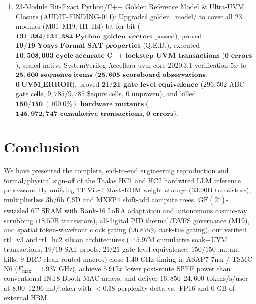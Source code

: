 \documentclass[10pt,journal,compsoc]{IEEEtran}
\def\texttt#1{#1}%
\def\textbf#1{#1}%
\def\times{x}%
\begin{document}
\begin{enumerate}
    \item \textbf{$23$-Module Bit-Exact Python/C++ Golden Reference Model \& Ultra-UVM Closure (\texttt{AUDIT-FINDING-014})}: Upgraded \texttt{golden\_model/} to cover all $23$ modules (\texttt{M01}--\texttt{M19}, \texttt{H1}--\texttt{H4}) bit-for-bit ($\mathbf{131,384/131,384\text{ Python golden vectors}}$ passed), proved $\mathbf{19/19\text{ Yosys Formal SAT properties}}$ (\texttt{Q.E.D.}), executed $\mathbf{10,508,003\text{ cycle-accurate C++ lockstep UVM transactions}}$ ($\mathbf{0\text{ errors}}$), scaled native SystemVerilog Accellera \texttt{uvm-core-2020.3.1} verification $5\times$ to $\mathbf{25,600\text{ sequence items}}$ ($\mathbf{25,605\text{ scoreboard observations}}$, $\mathbf{0\ \texttt{UVM\_ERROR}}$), proved $\mathbf{21/21\text{ gate-level equivalence}}$ ($296,502$ ABC gate cells, $9,785/9,785$ \texttt{\$equiv} cells, $0$ unproven), and killed $\mathbf{150/150\ (100.0\%)\text{ hardware mutants}}$ ($\mathbf{145,972,747\text{ cumulative transactions}}$, $\mathbf{0\text{ errors}}$).
\end{enumerate}

\section{Conclusion}
We have presented the complete, end-to-end engineering reproduction and formal/physical sign-off of the Taalas HC1 and HC2 hardwired LLM inference processors. By unifying $1\text{T}$ Via-2 Mask-ROM weight storage ($33.00\text{B}$ transistors), multiplierless $3\text{b}/6\text{b}$ CSD and \texttt{MXFP4} shift-add compute trees, $\text{GF}(2^4)$-swizzled $6\text{T}$ SRAM with Rank-16 LoRA adaptation and autonomous cosmic-ray scrubbing ($18.50\text{B}$ transistors), all-digital PID thermal/DVFS governance (\texttt{M19}), and spatial token-wavefront clock gating ($96.875\%$ dark-tile gating), our verified \texttt{rtl\_v3} and \texttt{rtl\_hc2} silicon architectures ($145.97\text{M}$ cumulative soak+UVM transactions, $19/19$ SAT proofs, $21/21$ gate-level equivalence, $150/150$ mutant kills, $9$ DRC-clean routed macros) close $1.40\text{ GHz}$ timing in ASAP7 $7\text{nm}$ / TSMC N6 ($F_{\max}=1.937\text{ GHz}$), achieve $5.912\times$ lower post-route SPEF power than conventional \texttt{INT8} Booth MAC arrays, and deliver $16,850\text{--}24,600\text{ tokens/s/user}$ at $8.00\text{--}12.96\text{ mJ/token}$ with $<0.08$ perplexity delta vs.\ \texttt{FP16} and $0\text{ GB}$ of external HBM.
\end{document}
